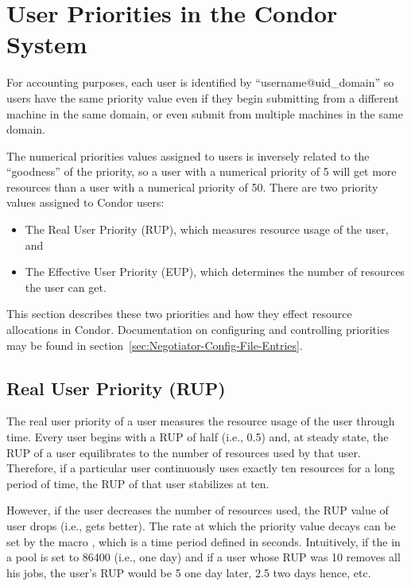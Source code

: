 \section{\label{sec:UserPrio}
User Priorities in the Condor System}
For accounting purposes, each user is identified by ``username@uid\_domain''
so users have the same priority value even if they begin submitting from a 
different machine in the same domain, or even submit from multiple machines 
in the same domain.

The numerical priorities values assigned to users is inversely related to the 
``goodness'' of the priority, so a user with a numerical priority of 5 will get 
more resources than a user with a numerical priority of 50.  There are two 
priority values assigned to Condor users:
\begin{itemize}
	\item The Real User Priority (RUP), which measures resource usage of the 
		user, and
	\item The Effective User Priority (EUP), which determines the number of
		resources the user can get.
\end{itemize}
This section describes these two priorities and how they effect resource
allocations in Condor.  Documentation on configuring and controlling 
priorities may be found in section~\ref{sec:Negotiator-Config-File-Entries}.

\subsection{Real User Priority (RUP)}
The real user priority of a user measures the resource usage of the user 
through time.  Every user begins with a RUP of half (i.e., 0.5) and,
at steady state, the RUP of a user equilibrates to the number of resources 
used by that user.  Therefore, if a particular user continuously uses exactly 
ten resources for a long period of time, the RUP of that user stabilizes at 
ten.

However, if the user decreases the number of resources used, the RUP value of 
user drops (i.e., gets better).  The rate at which the priority value decays 
can be set by the macro , which is a time period 
defined in seconds.   Intuitively, if the  in a pool 
is set to 86400 (i.e., one day) and if a user whose RUP was 10 removes all his 
jobs, the user's RUP would be 5 one day later, 2.5 two days hence, etc.

